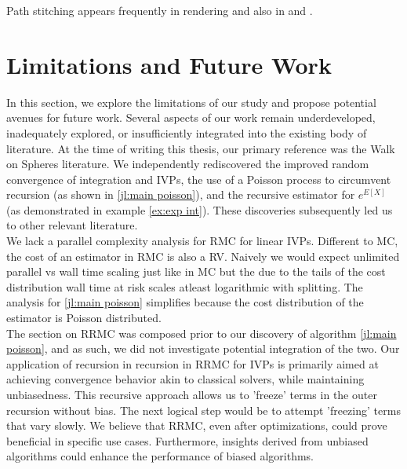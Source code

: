 \documentclass[a4paper,12pt]{article}
\begin{document}
\begin{related}
  Path stitching appears frequently in rendering and also in \cite{das_sarma_fast_2015}
  and \cite{ji_reusing_2012}.
\end{related}



\section{Limitations and Future Work}

In this section, we explore the limitations of our study and propose potential avenues for future work.
Several aspects of our work remain underdeveloped, inadequately explored, or insufficiently integrated
into the existing body of literature. At the time of writing this thesis, our
primary reference was the Walk on Spheres literature. We independently rediscovered
the improved random convergence of integration and IVPs, the
use of a Poisson process to circumvent recursion (as shown in \ref{jl:main poisson}),
and the recursive estimator for $e^{E[X]}$ (as demonstrated in example \ref{ex:exp int}).
These discoveries subsequently led us to other relevant literature. \\

We lack a parallel complexity analysis for RMC for linear IVPs. Different to MC, the cost of an estimator in RMC
is also a RV. Naively we would expect unlimited parallel vs wall time scaling  just like in MC but the due
to the tails of the cost distribution wall time at risk scales atleast logarithmic with splitting. The analysis
for \ref{jl:main poisson} simplifies because the cost distribution of the estimator is Poisson distributed.\\

The section on RRMC was composed prior to our discovery of algorithm \ref{jl:main poisson},
and as such, we did not investigate potential integration of the two. Our application of
recursion in recursion in RRMC for IVPs is primarily aimed at achieving convergence behavior
akin to classical solvers, while maintaining unbiasedness. This recursive approach allows us to
'freeze' terms in the outer recursion without bias. The next logical step would be
to attempt 'freezing' terms that vary slowly. We believe that RRMC, even after optimizations, could
prove beneficial in specific use cases. Furthermore, insights derived from unbiased algorithms could
enhance the performance of biased algorithms. \\
\end{document}
